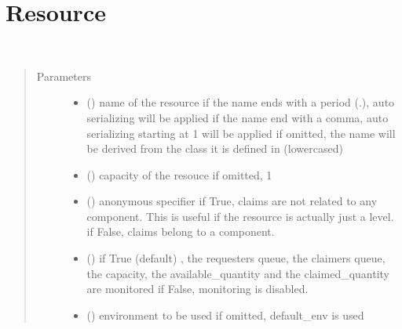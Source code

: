 \documentclass[letterpaper,10pt,english]{sphinxmanual}
\begin{document}
\section{Resource}
\label{\detokenize{Reference:resource}}

\begin{fulllineitems}
\label{\detokenize{Reference:salabim.Resource}}~\begin{quote}\begin{description}
\item[{Parameters}] \leavevmode\begin{itemize}
\item {} 
 () \textendash{} name of the resource 
if the name ends with a period (.),
auto serializing will be applied 
if the name end with a comma,
auto serializing starting at 1 will be applied 
if omitted, the name will be derived from the class
it is defined in (lowercased)

\item {} 
 () \textendash{} capacity of the resouce 
if omitted, 1

\item {} 
 () \textendash{} anonymous specifier 
if True, claims are not related to any component. This is useful
if the resource is actually just a level. 
if False, claims belong to a component.

\item {} 
 () \textendash{} if True (default) , the requesters queue, the claimers queue,
the capacity, the available\_quantity and the claimed\_quantity are monitored 
if False, monitoring is disabled.

\item {} 
 ({\hyperref[\detokenize{Reference:salabim.Environment}]{}}) \textendash{} environment to be used 
if omitted, default\_env is used

\end{itemize}


\end{description}
\end{quote}
\end{fulllineitems}
\end{document}
